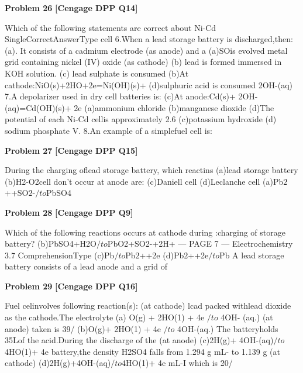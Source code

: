\begin{problembox}
\textbf{Problem 26} \hfill \textbf{[Cengage DPP Q14]}
\label{q:ext-cng_dpp_all_questions-26}

Which of the following statements are correct about Ni-Cd
SingleCorrectAnswerType
cell
6.When a lead storage battery is discharged,then:
(a). It consists of a cadmium electrode (as anode) and a
(a)SOis evolved
metal grid containing nickel (IV) oxide (as cathode)
(b) lead is formed
immersed in KOH solution.
(c) lead sulphate is consumed
(b)At cathode:NiO(s)+2HO+2e=Ni(OH)(s)+
(d)sulphuric acid is consumed
2OH-(aq)
7.A depolarizer used in dry cell batteries is:
(c)At anode:Cd(s)+ 2OH-(aq)=Cd(OH)(s)+ 2e
(a)ammonium chloride (b)manganese dioxide
(d)The potential of each Ni-Cd cellis approximately 2.6
(c)potassium hydroxide (d) sodium phosphate
V.
8.An example of a simplefuel cell is:
\end{problembox}

\begin{problembox}
\textbf{Problem 27} \hfill \textbf{[Cengage DPP Q15]}
\label{q:ext-cng_dpp_all_questions-27}

During the charging oflead storage battery, which reactins
(a)lead storage battery
(b)H2-O2cell
don't occur at anode are:
(c)Daniell cell
(d)Leclanche cell
(a)Pb$2$++SO$2$-$/to$PbSO4
\end{problembox}

\begin{problembox}
\textbf{Problem 28} \hfill \textbf{[Cengage DPP Q9]}
\label{q:ext-cng_dpp_all_questions-28}

Which of the following reactions occurs at cathode during
:charging of storage battery?
(b)PbSO4+H2O$/to$PbO2+SO2-+2H+
--- PAGE 7 ---
Electrochemistry 3.7
ComprehensionType
(c)Pb$/to$Pb$2$++2e
(d)Pb$2$++2e$/to$Pb
A lead storage battery consists of a lead anode and a grid of
\end{problembox}

\begin{problembox}
\textbf{Problem 29} \hfill \textbf{[Cengage DPP Q16]}
\label{q:ext-cng_dpp_all_questions-29}

Fuel celinvolves following reaction(s):
(at cathode)
lcad packed withlead dioxide as the cathode.The electrolyte
(a) O(g) + 2HO(1) + 4e $/to$ 4OH- (aq.)
(at anode)
taken is 39/%
(b)O(g)+ 2HO(1) + 4e $/to$ 4OH-(aq.)
The batteryholds 35Lof the acid.During the discharge of the
(at anode)
(c)2H(g)+ 4OH-(aq)$/to$4HO(1)+ 4e
battery,the density H2SO4 falls from 1.294 g mL- to 1.139 g
(at cathode)
(d)2H(g)+4OH-(aq)$/to$4HO(1)+ 4e
mL-I which is 20/%
\end{problembox}

